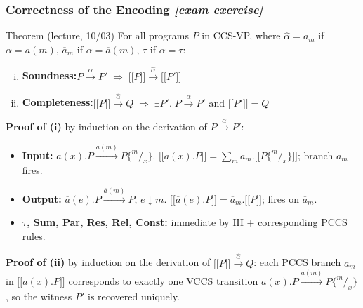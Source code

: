 \documentclass[t]{beamer}
\newcommand{\llbracket}{\mathopen{[\![}}
\newcommand{\rrbracket}{\mathclose{]\!]}}
\newcommand{\enc}[1]{\llbracket #1 \rrbracket}
\begin{document}
  \begin{frame}
    \frametitle{Correctness of the Encoding \quad \textit{[exam exercise]}}

    \begin{alertblock}{Theorem (lecture, 10/03)}
      For all programs $P$ in CCS-VP, where
      $\hat{\alpha} = a_m$ if $\alpha = a(m)$,\; $\overline{a}_m$ if $\alpha = \overline{a}(m)$,\; $\tau$ if $\alpha = \tau$:
      \begin{enumerate}[(i)]
        \item \textbf{Soundness:}\quad $P \xrightarrow{\alpha} P'
              \;\Longrightarrow\; \enc{P} \xrightarrow{\hat{\alpha}} \enc{P'}$
        \item \textbf{Completeness:}\quad $\enc{P} \xrightarrow{\hat{\alpha}} Q
              \;\Longrightarrow\; \exists P'.\; P \xrightarrow{\alpha} P' \text{ and } \enc{P'} = Q$
      \end{enumerate}
    \end{alertblock}

    \vspace{0.2cm}

    \textbf{Proof of (i)} by induction on the derivation of $P \xrightarrow{\alpha} P'$:
    \begin{itemize}
      \item \textbf{Input:} $a(x).P \xrightarrow{a(m)} P\{^m/_x\}$.
            $\enc{a(x).P} = \sum_m a_m.\enc{P\{^m/_x\}}$;\;
            branch $a_m$ fires. \checkmark
      \item \textbf{Output:} $\overline{a}(e).P \xrightarrow{\overline{a}(m)} P$, $e \!\downarrow\! m$.
            $\enc{\overline{a}(e).P} = \overline{a}_m.\enc{P}$;\; fires on $\overline{a}_m$. \checkmark
      \item \textbf{$\tau$, Sum, Par, Res, Rel, Const:} immediate by IH + corresponding PCCS rules.
    \end{itemize}

    \vspace{0.1cm}
    \textbf{Proof of (ii)} by induction on the derivation of $\enc{P} \xrightarrow{\hat{\alpha}} Q$:
    each PCCS branch $a_m$ in $\enc{a(x).P}$ corresponds to exactly one VCCS transition
    $a(x).P \xrightarrow{a(m)} P\{^m/_x\}$, so the witness $P'$ is recovered uniquely.

  \end{frame}
\end{document}
